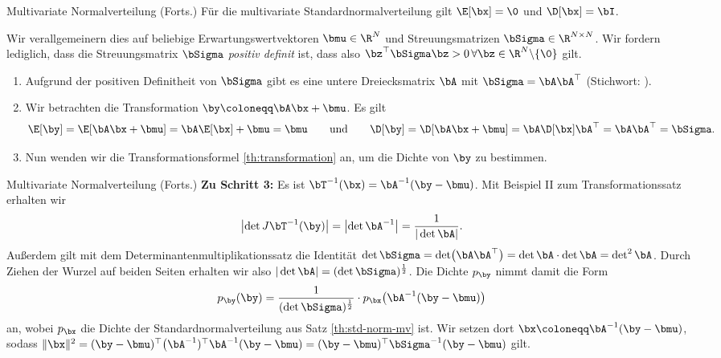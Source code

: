 \begin{frame}{Multivariate Normalverteilung (Forts.)}{}
	Für die multivariate Standardnormalverteilung gilt $\E[\bx] = \0$ und $\D[\bx] = \bI$.

	Wir verallgemeinern dies auf beliebige Erwartungswertvektoren $\bmu \in \R^N$ und Streuungsmatrizen
	$\bSigma \in \R^{N \times N}$.
	Wir fordern lediglich, dass die Streuungsmatrix $\bSigma$ \textit{positiv definit} ist, dass also
	$\bz^\top \bSigma \bz > 0\, \forall \bz \in \R^N \backslash \{ \0 \}$ gilt.

	\begin{enumerate}
		\item Aufgrund der positiven Definitheit von $\bSigma$ gibt es eine untere Dreiecksmatrix $\bA$ mit
			$\bSigma = \bA \bA^\top$ (Stichwort: ).
		\item Wir betrachten die Transformation $\by \coloneqq \bA \bx + \bmu$. Es gilt
		\begin{equation*}
			\E[\by]
				= \E[\bA \bx + \bmu] = \bA \E[\bx] + \bmu = \bmu \qquad\text{und}
		\qquad
			\D[\by]
				= \D[\bA \bx + \bmu] = \bA \D[\bx] \bA^\top = \bA \bA^\top = \bSigma.
		\end{equation*}
		\item Nun wenden wir die Transformationsformel \ref{th:transformation} an, um die Dichte von $\by$ zu bestimmen.
	\end{enumerate}
\end{frame}


\begin{frame}{Multivariate Normalverteilung (Forts.)}{}
	\textbf{Zu Schritt 3:} Es ist $\bT^{-1}(\bx) = \bA^{-1} (\by - \bmu)$. Mit Beispiel II zum Transformationssatz erhalten wir
	\begin{equation*}
		\bigl\vert \det J \bT^{-1}(\by) \bigr\vert = \bigl\vert \det \bA^{-1} \bigr\vert = \frac{1}{\vert \det \bA \vert}.
	\end{equation*}
	Außerdem gilt mit dem Determinantenmultiplikationssatz die Identität
	$\det \bSigma = \det\bigl( \bA \bA^\top \bigr) = \det \bA \cdot \det \bA = \det^2 \bA$.
	Durch Ziehen der Wurzel auf beiden Seiten erhalten wir also $\vert \det \bA \vert = (\det \bSigma)^{\frac{1}{2}}$. 
	Die Dichte $p_{\by}$ nimmt damit die Form
	\begin{equation*}
		p_{\by}(\by) = \frac{1}{(\det \bSigma)^\frac{1}{2}} \cdot p_{\bx}\bigl( \bA^{-1} (\by - \bmu) \bigr)
	\end{equation*}
	an, wobei $p_{\bx}$ die Dichte der Standardnormalverteilung aus Satz \ref{th:std-norm-mv} ist. Wir setzen dort
	$\bx \coloneqq \bA^{-1} (\by - \bmu)$, sodass
	$\Vert \bx \Vert^2 = (\by - \bmu)^\top \bigl(\bA^{-1})^\top \bA^{-1} (\by - \bmu) = (\by - \bmu)^\top \bSigma^{-1} (\by - \bmu)$
	gilt. 
\end{frame}



